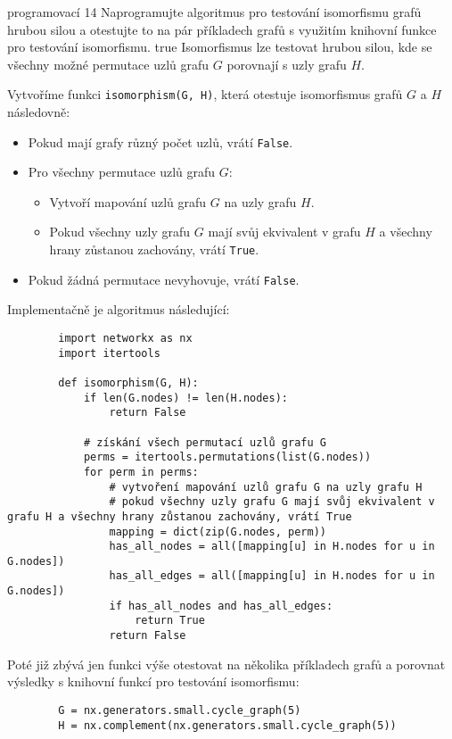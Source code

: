\documentclass[10pt, a4paper]{ReportSheet}
\begin{document}
    \begin{uloha}{programovací 1}{4}{
        Naprogramujte algoritmus pro testování isomorfismu grafů hrubou silou a otestujte to na pár příkladech grafů s využitím knihovní funkce pro testování isomorfismu.
    }{true}
        Isomorfismus lze testovat hrubou silou, kde se všechny možné permutace uzlů grafu $G$ porovnají s uzly grafu $H$.

        Vytvoříme funkci \texttt{isomorphism(G, H)}, která otestuje isomorfismus grafů $G$ a $H$ následovně:
        \begin{itemize}
            \item Pokud mají grafy různý počet uzlů, vrátí \texttt{False}.
            \item Pro všechny permutace uzlů grafu $G$:
            \begin{itemize}
                \item Vytvoří mapování uzlů grafu $G$ na uzly grafu $H$.
                \item Pokud všechny uzly grafu $G$ mají svůj ekvivalent v grafu $H$ a všechny hrany zůstanou zachovány, vrátí \texttt{True}.
            \end{itemize}
            \item Pokud žádná permutace nevyhovuje, vrátí \texttt{False}.
        \end{itemize}

        Implementačně je algoritmus následující:
        \begin{verbatim}
        import networkx as nx
        import itertools

        def isomorphism(G, H):
            if len(G.nodes) != len(H.nodes):
                return False

            # získání všech permutací uzlů grafu G
            perms = itertools.permutations(list(G.nodes))
            for perm in perms:
                # vytvoření mapování uzlů grafu G na uzly grafu H
                # pokud všechny uzly grafu G mají svůj ekvivalent v grafu H a všechny hrany zůstanou zachovány, vrátí True
                mapping = dict(zip(G.nodes, perm))
                has_all_nodes = all([mapping[u] in H.nodes for u in G.nodes])
                has_all_edges = all([mapping[u] in H.nodes for u in G.nodes])
                if has_all_nodes and has_all_edges:
                    return True
                return False
        \end{verbatim}

        Poté již zbývá jen funkci výše otestovat na několika příkladech grafů a porovnat výsledky s knihovní funkcí pro
        testování isomorfismu:
        \begin{verbatim}
        G = nx.generators.small.cycle_graph(5)
        H = nx.complement(nx.generators.small.cycle_graph(5))


\end{verbatim}
\end{uloha}
\end{document}
